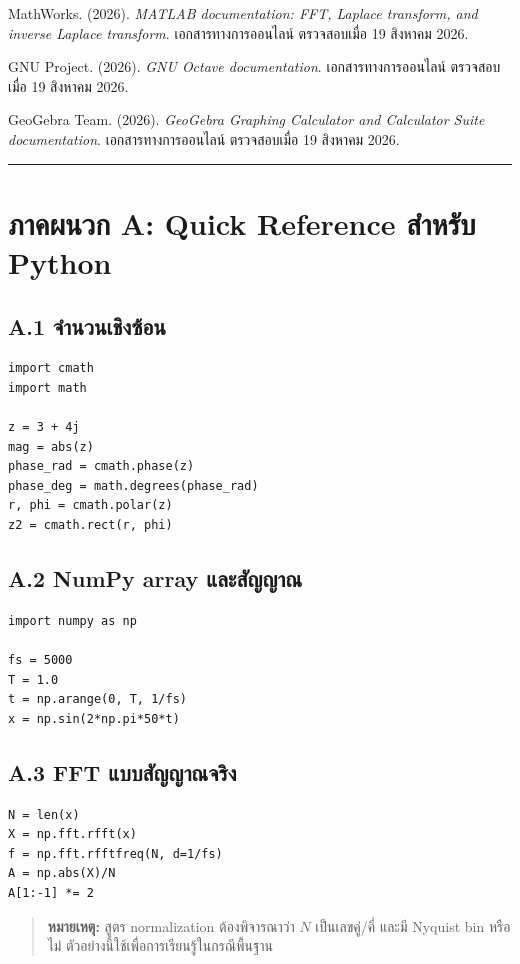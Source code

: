 MathWorks. (2026). \textit{MATLAB documentation: FFT, Laplace transform, and inverse Laplace transform}. เอกสารทางการออนไลน์ ตรวจสอบเมื่อ 19 สิงหาคม 2026.

GNU Project. (2026). \textit{GNU Octave documentation}. เอกสารทางการออนไลน์ ตรวจสอบเมื่อ 19 สิงหาคม 2026.

GeoGebra Team. (2026). \textit{GeoGebra Graphing Calculator and Calculator Suite documentation}. เอกสารทางการออนไลน์ ตรวจสอบเมื่อ 19 สิงหาคม 2026.

\par\noindent\rule{\textwidth}{0.4pt}\par

\section{ภาคผนวก A: Quick Reference สำหรับ Python}

\subsection{A.1 จำนวนเชิงซ้อน}

\begin{verbatim}
import cmath
import math

z = 3 + 4j
mag = abs(z)
phase_rad = cmath.phase(z)
phase_deg = math.degrees(phase_rad)
r, phi = cmath.polar(z)
z2 = cmath.rect(r, phi)
\end{verbatim}

\subsection{A.2 NumPy array และสัญญาณ}

\begin{verbatim}
import numpy as np

fs = 5000
T = 1.0
t = np.arange(0, T, 1/fs)
x = np.sin(2*np.pi*50*t)
\end{verbatim}

\subsection{A.3 FFT แบบสัญญาณจริง}

\begin{verbatim}
N = len(x)
X = np.fft.rfft(x)
f = np.fft.rfftfreq(N, d=1/fs)
A = np.abs(X)/N
A[1:-1] *= 2
\end{verbatim}

\begin{quote}
\textbf{หมายเหตุ:} สูตร normalization ต้องพิจารณาว่า $N$ เป็นเลขคู่/คี่ และมี Nyquist bin หรือไม่ ตัวอย่างนี้ใช้เพื่อการเรียนรู้ในกรณีพื้นฐาน
\end{quote}

